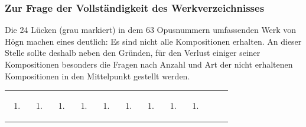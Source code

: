 \subsubsection{Zur Frage der Vollständigkeit des Werkverzeichnisses}

Die 24
Lücken (grau markiert) in dem 63 Opusnummern umfassenden Werk von Högn
machen eines deutlich: Es sind nicht alle Kompositionen erhalten. An
dieser Stelle sollte deshalb neben den Gründen, für den Verlust einiger
seiner Kompositionen besonders die Fragen nach Anzahl und Art der nicht
erhaltenen Kompositionen in den Mittelpunkt gestellt werden.

\begin{center}
\begin{minipage}{8.096cm}
\begin{flushleft}
\tablefirsthead{}
\tablehead{}
\tabletail{}
\tablelasttail{}
\begin{supertabular}{|m{0.60800004cm}|m{0.60800004cm}|m{0.60800004cm}|m{0.60800004cm}|m{0.60800004cm}|m{0.60800004cm}|m{0.60800004cm}|m{0.60800004cm}|m{0.60800004cm}|m{0.626cm}|}
\hline
\begin{enumerate}
\item
\end{enumerate}
 &
\begin{enumerate}
\item
\end{enumerate}
 &
\begin{enumerate}
\item
\end{enumerate}
 &
\begin{enumerate}
\item
\end{enumerate}
 &
\begin{enumerate}
\item
\end{enumerate}
 &
\begin{enumerate}
\item
\end{enumerate}
 &
\begin{enumerate}
\item
\end{enumerate}
 &
\begin{enumerate}
\item
\end{enumerate}
 &
\begin{enumerate}
\item
\end{enumerate}
 &
\begin{enumerate}

\end{enumerate}
\end{supertabular}
\end{flushleft}
\end{minipage}
\end{center}
